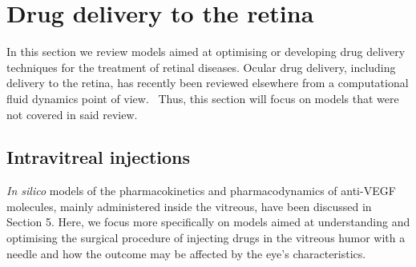 \documentclass[12pt,a4paper]{journal}
\begin{document}
\section*{Drug delivery to the retina}

In this section we review models aimed at optimising or developing drug delivery techniques for the treatment of retinal diseases.
Ocular drug delivery, including delivery to the retina, has recently been reviewed elsewhere from a computational fluid dynamics point of view.~\cite{Bhandari_2021}
Thus, this section will focus on models that were not covered in said review.

\subsection*{Intravitreal injections}

\textit{In silico} models of the pharmacokinetics and pharmacodynamics of anti-VEGF molecules, mainly administered inside the vitreous, have been discussed in Section 5.
Here, we focus more specifically on models aimed at understanding and optimising the surgical procedure of injecting drugs in the vitreous humor with a needle and how the outcome may be affected by the eye's characteristics.
\end{document}
